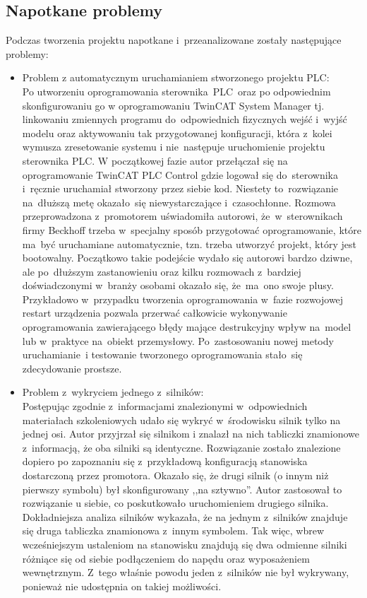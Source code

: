 \subsection{Napotkane problemy}
\label{subsec:problemy}
Podczas tworzenia projektu napotkane i~przeanalizowane zostały następujące problemy:
\begin{itemize}
\item Problem z automatycznym uruchamianiem stworzonego projektu PLC:\\[1mm]
Po utworzeniu oprogramowania sterownika~PLC~oraz po odpowiednim skonfigurowaniu go w oprogramowaniu TwinCAT System Manager tj. linkowaniu zmiennych programu do~odpowiednich fizycznych wejść i~wyjść modelu oraz aktywowaniu tak przygotowanej konfiguracji, która z~kolei wymusza zresetowanie systemu i nie~następuje uruchomienie projektu sterownika PLC. W początkowej fazie autor przełączał się na oprogramowanie TwinCAT PLC Control gdzie logował się do~sterownika i~ręcznie uruchamiał stworzony przez siebie kod. Niestety to~rozwiązanie na~dłuższą metę okazało~się niewystarczające i~czasochłonne. Rozmowa przeprowadzona z~promotorem uświadomiła autorowi, że~w~sterownikach firmy Beckhoff trzeba w~specjalny sposób przygotować oprogramowanie, które ma~być uruchamiane automatycznie, tzn. trzeba utworzyć projekt, który jest bootowalny. Początkowo takie podejście wydało się autorowi bardzo dziwne, ale po~dłuższym zastanowieniu oraz kilku rozmowach z~bardziej doświadczonymi w~branży osobami okazało się, że~ma~ono swoje plusy. Przykładowo w~przypadku tworzenia oprogramowania w~fazie rozwojowej restart urządzenia pozwala przerwać całkowicie wykonywanie oprogramowania zawierającego błędy mające destrukcyjny wpływ na~model lub w~praktyce na~obiekt przemysłowy. Po~zastosowaniu nowej metody uruchamianie~i testowanie tworzonego oprogramowania stało~się zdecydowanie prostsze.

\item Problem z~wykryciem jednego z~silników:\\[1mm]
Postępując zgodnie z~informacjami znalezionymi w~odpowiednich materiałach szkoleniowych udało się wykryć w~środowisku silnik tylko na jednej osi. Autor przyjrzał się silnikom i znalazł na nich tabliczki znamionowe z~informacją, że oba silniki są identyczne. Rozwiązanie zostało znalezione dopiero po zapoznaniu się z~przykładową konfiguracją stanowiska dostarczoną przez promotora. Okazało się, że drugi silnik (o innym niż pierwszy symbolu) był skonfigurowany ,,na sztywno''. Autor zastosował to rozwiązanie u siebie, co poskutkowało uruchomieniem drugiego silnika. Dokładniejsza analiza silników wykazała, że na jednym z~silników znajduje się druga tabliczka znamionowa z~innym symbolem. Tak więc, wbrew wcześniejszym ustaleniom na stanowisku znajdują się dwa odmienne silniki różniące się od siebie podłączeniem do napędu oraz wyposażeniem wewnętrznym. Z~tego właśnie powodu jeden z~silników nie był wykrywany, ponieważ nie udostępnia on takiej możliwości.


\end{itemize}
